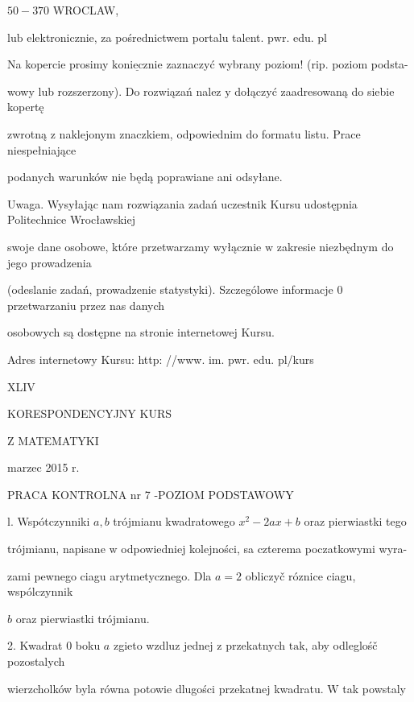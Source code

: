 \documentclass[a4paper,12pt]{article}
\begin{document}
$50-370$ WROCLAW,

$\mathrm{l}\mathrm{u}\mathrm{b}$ elektronicznie, za pośrednictwem portalu talent. $\mathrm{p}\mathrm{w}\mathrm{r}$. edu. pl

Na kopercie prosimy $\underline{\mathrm{k}\mathrm{o}\mathrm{n}\mathrm{i}\mathrm{e}\mathrm{c}\mathrm{z}\mathrm{n}\mathrm{i}\mathrm{e}}$ zaznaczyć wybrany poziom! (rip. poziom podsta-

wowy lub rozszerzony). Do rozwiązań nalez $\mathrm{y}$ dołączyć zaadresowaną do siebie kopertę

zwrotną $\mathrm{z}$ naklejonym znaczkiem, odpowiednim do formatu listu. Prace niespełniające

podanych warunków nie będą poprawiane ani odsyłane.

Uwaga. Wysyłając nam rozwiązania zadań uczestnik Kursu udostępnia Politechnice Wrocławskiej

swoje dane osobowe, które przetwarzamy wyłącznie $\mathrm{w}$ zakresie niezbędnym do jego prowadzenia

(odeslanie zadań, prowadzenie statystyki). Szczególowe informacje $0$ przetwarzaniu przez nas danych

osobowych są dostępne na stronie internetowej Kursu.

Adres internetowy Kursu: http: //www. im. pwr. edu. pl/kurs







XLIV

KORESPONDENCYJNY KURS

Z MATEMATYKI

marzec 2015 r.

PRACA KONTROLNA nr 7 -POZIOM PODSTAWOWY

l. Wspótczynniki $a, b$ trójmianu kwadratowego $x^{2} -2ax+b$ oraz pierwiastki tego

trójmianu, napisane $\mathrm{w}$ odpowiedniej kolejności, sa czterema poczatkowymi wyra-

zami pewnego ciagu arytmetycznego. Dla $a=2$ obliczyč róznice ciagu, wspólczynnik

$b$ oraz pierwiastki trójmianu.

2. Kwadrat $0$ boku $a$ zgieto wzdluz jednej $\mathrm{z}$ przekatnych $\mathrm{t}\mathrm{a}\mathrm{k}$, aby odleglośč pozostalych

wierzcholków byla równa potowie dlugości przekatnej kwadratu. $\mathrm{W}$ tak powstaly
\end{document}
